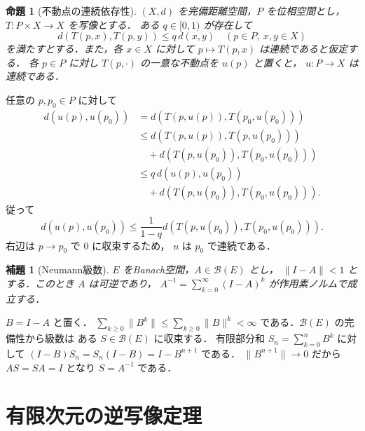 \documentclass[a5paper,10pt,onecolumn]{jsarticle}
\makeatletter
\theoremstyle{mathnotetheorem}
\newtheorem{lemma}[theorem]{補題}
\newtheorem{proposition}[theorem]{命題}
\renewcommand{\proofname}{証明}
\renewenvironment{proof}[1][\proofname]{%
  \par\pushQED{\qed}\normalfont\topsep4\p@\@plus2\p@\relax
  \trivlist\item[\hskip\labelsep\bfseries #1]\ignorespaces
}{\popQED\endtrivlist\@endpefalse}
\newcommand{\norm}[1]{\lVert #1\rVert}
\makeatother
\begin{document}
\begin{proposition}[不動点の連続依存性]\label{prop:parameter}
$(X,d)$ を完備距離空間，$P$ を位相空間とし，
$T:P\times X\to X$ を写像とする．
ある $q\in[0,1)$ が存在して
\[
 d(T(p,x),T(p,y))\le q\,d(x,y)
 \quad(p\in P,\ x,y\in X)
\]
を満たすとする．また，各 $x\in X$ に対して
$p\mapsto T(p,x)$ は連続であると仮定する．
各 $p\in P$ に対し $T(p,\cdot)$ の一意な不動点を $u(p)$ と置くと，
$u:P\to X$ は連続である．
\end{proposition}
\begin{proof}
任意の $p,p_0\in P$ に対して
\begin{align*}
 d(u(p),u(p_0))
 &=d(T(p,u(p)),T(p_0,u(p_0)))\\
 &\le d(T(p,u(p)),T(p,u(p_0)))\\
 &\quad+d(T(p,u(p_0)),T(p_0,u(p_0)))\\
 &\le q\,d(u(p),u(p_0))\\
 &\quad+d(T(p,u(p_0)),T(p_0,u(p_0))).
\end{align*}
従って
\[
 d(u(p),u(p_0))
 \le\frac{1}{1-q}
 d(T(p,u(p_0)),T(p_0,u(p_0))).
\]
右辺は $p\to p_0$ で $0$ に収束するため，
$u$ は $p_0$ で連続である．
\end{proof}

\begin{lemma}[Neumann級数]\label{lem:neumann}
$E$ をBanach空間，$A\in\mathcal B(E)$ とし，
$\norm{I-A}<1$ とする．このとき $A$ は可逆であり，
$A^{-1}=\sum_{k=0}^{\infty}(I-A)^k$ が作用素ノルムで成立する．
\end{lemma}
\begin{proof}
$B=I-A$ と置く．
$\sum_{k\ge0}\norm{B^k}\le\sum_{k\ge0}\norm B^k<\infty$
である．$\mathcal B(E)$ の完備性から級数は
ある $S\in\mathcal B(E)$ に収束する．
有限部分和 $S_n=\sum_{k=0}^n B^k$ に対して
$(I-B)S_n=S_n(I-B)=I-B^{n+1}$ である．
$\norm{B^{n+1}}\to0$ だから
$AS=SA=I$ となり $S=A^{-1}$ である．
\end{proof}

\section{有限次元の逆写像定理}
\end{document}
